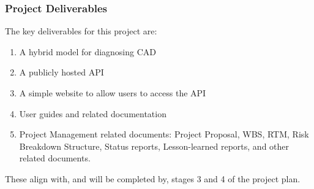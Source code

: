 \documentclass[a4paper, 12pt]{article}
\begin{document}
        \subsubsection{Project Deliverables} \label{deliv}
        The key deliverables for this project are:
        \begin{enumerate}
            \item A hybrid model for diagnosing CAD
            \item A publicly hosted API
            \item A simple website to allow users to access the API
            \item User guides and related documentation
            \item Project Management related documents: Project Proposal, WBS, RTM, Risk Breakdown Structure, Status reports, Lesson-learned reports, and other related documents.
        \end{enumerate}
        These align with, and will be completed by, stages 3 and 4 of the project plan.
        
\end{document}
